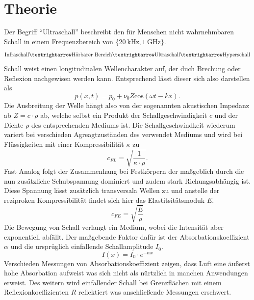 \section{Theorie}
Der Begriff \enquote{Ultraschall} beschreibt den für Menschen nicht wahrnehmbaren Schall in einem Frequenzbereich von $\{\SI{20}{\kilo\hertz},\SI{1}{\giga\hertz}\}$.
\begin{align*}
    \text{Infraschall}  \textrightarrow \text{Hörbarer Bereich}  \textrightarrow \text{Ultraschall}  \textrightarrow \text{Hyperschall} 
\end{align*} 
Schall weist einen longitudinalen Wellencharakter auf, der duch Brechung oder Reflexion nachgewisen werden kann. Entsprechend lässt dieser sich also darstellen als
\begin{equation*}
    p(x,t) =  p_0 + \nu_0 Z \text{cos} (\omega t - kx).
\end{equation*}
Die Ausbreitung der Welle hängt also von der sogenannten akustischen Impedanz ab $Z=c\cdot\rho$ ab, welche selbst ein Produkt der
Schallgeschwindigkeit $c$ und der Dichte $\rho$ des entsprechenden Mediums ist. Die Schallgeschwindkeit wiederum variert bei verschieden Agreagtzuständen des verwendet Mediums
und wird bei Flüssigkeiten mit einer Kompressibilität $\kappa$ zu
\begin{equation*}
    c_{FL}=\sqrt{\frac{1}{\kappa \cdot \rho}}.
\end{equation*}
Fast Analog folgt der Zusammenhang bei Festkörpern der maßgeblich durch die nun zusätzliche Schubspannung dominiert und zudem stark Richungsabhängig ist.
Diese Spannung lässt zusätzlich transversala Wellen zu und anstelle der reziproken Kompressibilität findet sich hier das Elastitsitätsmoduk $E$.
\begin{equation*}
    c_{FE}=\sqrt{\frac{E}{\rho}}
\end{equation*}
Die Bewegung von Schall verlangt ein Medium, wobei die Intensität aber exponentiell abfällt.
Der maßgebende Faktor dafür ist der Absorbationskoeffizient $\alpha$ und die ursprüglich einfallende Schallamplitude $I_0$.
\begin{equation}
    \label{eq:dummsumm}
    I(x)=I_0 \cdot e^{-\alpha x}
\end{equation}
Verschieden Messungen von Absorbationskoeffizient %
zeigen, dass Luft eine äußerst hohe Absorbation aufweist was sich nicht als nürtzlich in manchen Anwendungen erweist.
Des weitern wird einfallender Schall bei Grenzflächen mit einem Reflexionkoeffizienten $R$ reflektiert was anschließende Messungen erschwert.
